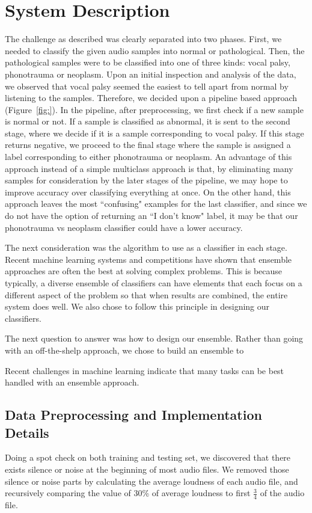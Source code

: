 \section{System Description}
The challenge as described was clearly separated into two phases. First, we needed to classify the given audio samples into normal or pathological. Then, the pathological samples were to be classified into one of three kinds: vocal palsy, phonotrauma or neoplasm. Upon an initial inspection and analysis of the data, we observed that vocal palsy seemed the easiest to tell apart from normal by listening to the samples. Therefore, we decided upon a pipeline based approach (Figure~\ref{fig:}). In the pipeline, after preprocessing, we first check if a new sample is normal or not. If a sample is classified as abnormal, it is sent to the second stage, where we decide if it is a sample corresponding to vocal palsy. If this stage returns negative, we proceed to the final stage where the sample is assigned a label corresponding to either phonotrauma or neoplasm. An advantage of this approach instead of a simple multiclass approach is that, by eliminating many samples for consideration by the later stages of the pipeline, we may hope to improve accuracy over classifying everything at once. On the other hand, this approach leaves the most ``confusing" examples for the last classifier, and since we do not have the option of returning an ``I don't know" label, it may be that our phonotrauma vs neoplasm classifier could have a lower accuracy.

The next consideration was the algorithm to use as a classifier in each stage. Recent machine learning systems and competitions have shown that ensemble approaches are often the best at solving complex problems. This is because typically, a diverse ensemble of classifiers can have elements that each focus on a different aspect of the problem so that when results are combined, the entire system does well. We also chose to follow this principle in designing our classifiers. 

The next question to answer was how to design our ensemble. Rather than going with an off-the-shelp approach, we chose to build an ensemble to 

Recent challenges in machine learning indicate that many tasks can be best handled with an ensemble approach. 
\subsection{Data Preprocessing and Implementation Details}
	Doing a spot check on both training and testing set, we discovered that there exists silence or noise at the beginning of most audio files. We removed those silence or noise parts by calculating the average loudness of each audio file, and recursively comparing the value of 30\% of average loudness to first $\frac{3}{4}$ of the audio file.

